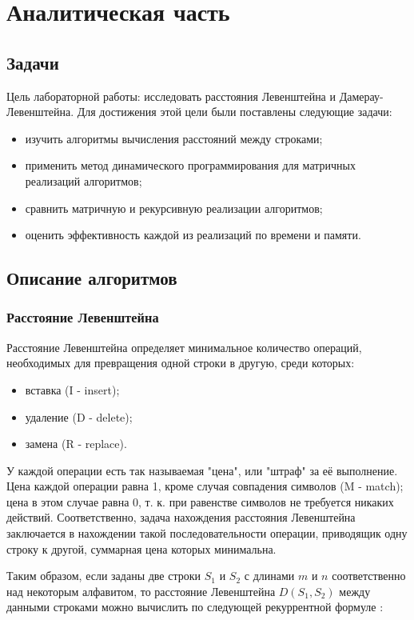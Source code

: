 \documentclass[12pt, a4paper]{report}
\begin{document}
    \chapter{Аналитическая часть}

	\section{Задачи}
	Цель лабораторной работы: исследовать расстояния Левенштейна и Дамерау-Левенштейна. Для достижения этой цели были поставлены следующие задачи: 
	\begin{itemize}
		\item изучить алгоритмы вычисления расстояний между строками;
		\item применить метод динамического программирования для матричных реализаций алгоритмов;
		\item сравнить матричную и рекурсивную реализации алгоритмов;
		\item оценить эффективность каждой из реализаций по времени и памяти.
	\end{itemize}

	\section{Описание алгоритмов}
	\subsection{Расстояние Левенштейна}
	Расстояние Левенштейна определяет минимальное количество операций, необходимых для превращения одной строки в другую, среди которых:
	\begin{itemize}
		\item вставка (I - insert);
		\item удаление (D - delete);
		\item замена (R - replace).
	\end{itemize}
	У каждой операции есть так называемая "цена", или "штраф" за её выполнение. Цена каждой операции равна 1, кроме случая совпадения символов (M - match); цена в этом случае равна 0, т. к. при равенстве символов не требуется никаких действий. Соответственно, задача нахождения расстояния Левенштейна заключается в нахождении такой последовательности операции, приводящик одну строку к другой, суммарная цена которых минимальна.

	Таким образом, если заданы две строки $S_{1}$ и $S_{2}$ с длинами $m$ и $n$ соответственно над некоторым алфавитом, то расстояние Левенштейна $D(S_{1}, S_{2})$ между данными строками можно вычислить по следующей рекуррентной формуле \cite{recurs}:
\end{document}
